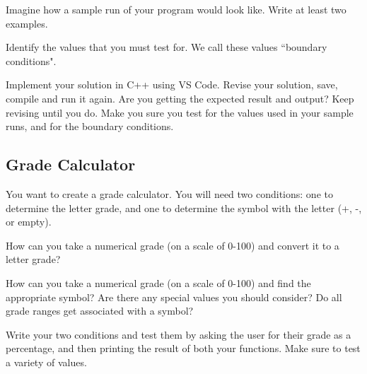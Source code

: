 \vspace{4cm}

\begin{multipart}
     Imagine how a sample run of your program would look like. Write at least two examples.
\end{multipart}

\vspace{4cm}

\begin{multipart}
    Identify the values that you must test for. We call these values ``boundary conditions".
\end{multipart}

\vspace{4cm}

\begin{multipart}
    Implement your solution in C++ using VS Code. Revise your solution, save, compile and run it again. Are you getting the expected result and output? Keep revising until you do. Make you sure you test for the values used in your sample runs, and for the boundary conditions. 
\end{multipart}

\subsection{Grade Calculator}
You want to create a grade calculator. You will need two conditions: one to determine the letter grade, and one to determine the symbol with the letter (+, -, or empty). 

\begin{multipart}
    How can you take a numerical grade (on a scale of 0-100) and convert it to a letter grade?
\end{multipart}

\vspace{4cm}

\begin{multipart}
    How can you take a numerical grade (on a scale of 0-100) and find the appropriate symbol? Are there any special values you should consider? Do all grade ranges get associated with a symbol?
\end{multipart}

\vspace{4cm}

\begin{multipart}
    Write your two conditions and test them by asking the user for their grade as a percentage, and then printing the result of both your functions. Make sure to test a variety of values.
\end{multipart}

